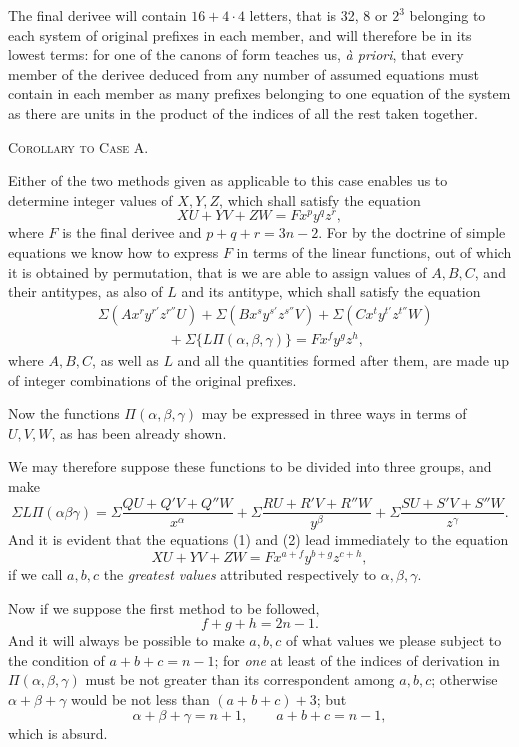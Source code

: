 \documentclass[11pt]{article}
\newcommand{\sourcepage}[1]{\marginpar{\scriptsize p.~#1}}
\begin{document}
The final derivee will contain $16+4\cdot4$ letters, that is 32, 8 or $2^3$ belonging to each system of original prefixes in each member, and will therefore be in its lowest terms: for one of the canons of form teaches us, \emph{\`a priori}, that every member of the derivee deduced from any number of assumed equations must contain in each member as many prefixes belonging to one equation of the system as there are units in the product of the indices of all the rest taken together.

\begin{center}\scshape Corollary to Case A.\end{center}

Either of the two methods given as applicable to this case enables us to determine integer values of $X,Y,Z$, which shall satisfy the equation
\[
 XU+YV+ZW=Fx^p y^q z^r,
\]
where $F$ is the final derivee and $p+q+r=3n-2$. For by the doctrine of simple equations we know how to express $F$ in terms of the linear functions, out of which it is obtained by permutation, that is we are able to assign values of $A,B,C$, and their antitypes, as also of $L$ and its antitype, which shall satisfy the equation
\[
\begin{aligned}
 &\Sigma(Ax^r y^{r'}z^{r''}U)+\Sigma(Bx^s y^{s'}z^{s''}V)+\Sigma(Cx^t y^{t'}z^{t''}W)\\
 &\hspace{5em}+\Sigma\{L\Pi(\alpha,\beta,\gamma)\}=Fx^f y^g z^h,
\end{aligned}\tag{1}
\]
where $A,B,C$, as well as $L$ and all the quantities formed after them, are made up of integer combinations of the original prefixes.

Now the functions $\Pi(\alpha,\beta,\gamma)$ may be expressed in three ways in terms of $U,V,W$, as has been already shown.

\sourcepage{82}
We may therefore suppose these functions to be divided into three groups, and make
\[
 \Sigma L\Pi(\alpha\beta\gamma)=
 \Sigma\frac{QU+Q'V+Q''W}{x^\alpha}
 +\Sigma\frac{RU+R'V+R''W}{y^\beta}
 +\Sigma\frac{SU+S'V+S''W}{z^\gamma}. \tag{2}
\]
And it is evident that the equations (1) and (2) lead immediately to the equation
\[
 XU+YV+ZW=Fx^{a+f}y^{b+g}z^{c+h},
\]
if we call $a,b,c$ the \emph{greatest values} attributed respectively to $\alpha,\beta,\gamma$.

Now if we suppose the first method to be followed,
\[
 f+g+h=2n-1.
\]
And it will always be possible to make $a,b,c$ of what values we please subject to the condition of $a+b+c=n-1$; for \emph{one} at least of the indices of derivation in $\Pi(\alpha,\beta,\gamma)$ must be not greater than its correspondent among $a,b,c$; otherwise $\alpha+\beta+\gamma$ would be not less than $(a+b+c)+3$; but
\[
 \alpha+\beta+\gamma=n+1,
 \qquad
 a+b+c=n-1,
\]
which is absurd.
\end{document}
